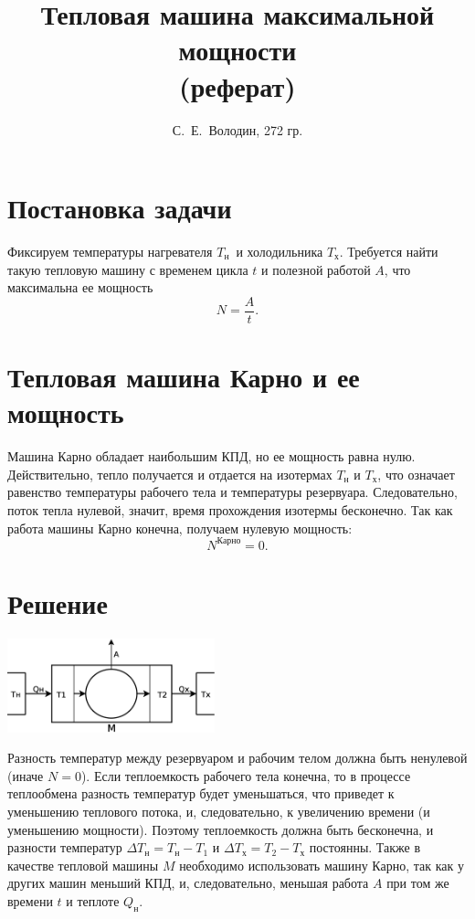 \documentclass[a4paper]{article}
\title{Тепловая машина максимальной мощности\\(реферат)}
\author{С.~Е.~Володин, 272 гр.}
\date{}
\newcommand{\Tx}{$T_\text{х}$}
\newcommand{\Tn}{$T_\text{н}$}
\begin{document}
\maketitle
\section{Постановка задачи}
Фиксируем температуры нагревателя \Tn\ и холодильника \Tx. Требуется найти такую тепловую машину с временем цикла $t$ и полезной работой $A$, что максимальна ее мощность
$$
N=\frac{A}{t}.
$$
\section{Тепловая машина Карно и ее мощность}
Машина Карно обладает наибольшим КПД, но ее мощность равна нулю. Действительно, тепло получается и отдается на изотермах $T_{\text{н}}$ и $T_{\text{х}}$, что означает равенство температуры рабочего тела и температуры резервуара. Следовательно, поток тепла нулевой, значит, время прохождения изотермы бесконечно. Так как работа машины Карно конечна, получаем нулевую мощность:
$$
N^{\text{Карно}}=0.
$$
\section{Решение}
\begin{floatingfigure}[l]{7cm}
\includegraphics[width=6cm]{maxN}
\end{floatingfigure}
Разность температур между резервуаром и рабочим телом должна быть ненулевой (иначе $N=0$).\newline
Если теплоемкость рабочего тела конечна, то в процессе теплообмена разность температур будет уменьшаться, что приведет к уменьшению теплового потока, и, следовательно, к увеличению времени (и уменьшению мощности). Поэтому теплоемкость должна быть бесконечна, и разности температур $\Delta T_\text{н}=T_\text{н}-T_1$ и $\Delta T_\text{х}=T_2-T_\text{х}$ постоянны.\newline
Также в качестве тепловой машины $M$ необходимо использовать машину Карно, так как у других машин меньший КПД, и, следовательно, меньшая работа $A$ при том же времени $t$ и теплоте $Q_{\text{н}}$.
\end{document}
